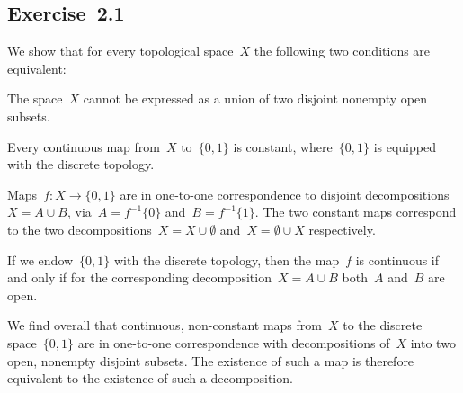 \subsection{Exercise~2.1}
\label{exercise 2.1}

We show that for every topological space~$X$ the following two conditions are equivalent:
\begin{equivalenceslist*}

	\item
		The space~$X$ cannot be expressed as a union of two disjoint nonempty open subsets.

	\item
		Every continuous map from~$X$ to~$\{ 0, 1 \}$ is constant, where~$\{ 0, 1 \}$ is equipped with the discrete topology.

\end{equivalenceslist*}

Maps~$f \colon X \to \{ 0, 1 \}$ are in one-to-one correspondence to disjoint decompositions~$X = A ∪ B$, via~$A = f^{-1} \{ 0 \}$ and~$B = f^{-1} \{ 1 \}$.
The two constant maps correspond to the two decompositions~$X = X ∪ ∅$ and~$X = ∅ ∪ X$ respectively.

If we endow~$\{ 0, 1 \}$ with the discrete topology, then the map~$f$ is continuous if and only if for the corresponding decomposition~$X = A ∪ B$ both~$A$ and~$B$ are open.

We find overall that continuous, non-constant maps from~$X$ to the discrete space~$\{ 0, 1 \}$ are in one-to-one correspondence with decompositions of~$X$ into two open, nonempty disjoint subsets.
The existence of such a map is therefore equivalent to the existence of such a decomposition.
